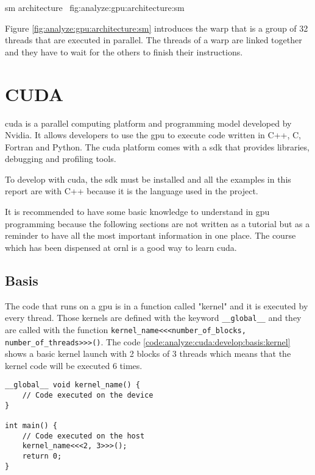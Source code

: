 {\acrshort{sm} architecture~\cite{nvidia-a100-architecture}}
{fig:analyze:gpu:architecture:sm}

Figure \ref{fig:analyze:gpu:architecture:sm} introduces the warp that is a
group of 32 threads that are executed in parallel.
The threads of a warp are linked together and they have to wait for the others
to finish their instructions.


\section{CUDA}
\label{ch:analyze:cuda}

\acrfull{cuda} is a parallel computing platform and programming model developed
by Nvidia.
It allows developers to use the \acrshort{gpu} to execute code written in C++, C, Fortran
and Python.
The \acrshort{cuda} platform comes with a \acrshort{sdk} that provides
libraries, debugging and profiling tools.

To develop with \acrshort{cuda}, the \acrshort{sdk} must be installed and all
the examples in this report are with C++ because it is the language used in the
project.

It is recommended to have some basic knowledge to understand in \acrshort{gpu}
programming because the following sections are not written as a tutorial but as
a reminder to have all the most important information in one place.
The course~\cite{cuda-training} which has been dispensed at \acrshort{ornl} is
a good way to learn \acrshort{cuda}.

\subsection{Basis}
\label{ch:analyze:cuda:basis}

The code that runs on a \acrshort{gpu} is in a function called "kernel" and it
is executed by every thread.
Those kernels are defined with the keyword \texttt{\_\_global\_\_} and they are called
with the function \texttt{kernel\_name<<<number\_of\_blocks, number\_of\_threads>>>()}.
The code \ref{code:analyze:cuda:develop:basis:kernel} shows a basic kernel
launch with 2 blocks of 3 threads which means that the kernel code will be
executed 6 times.

\begin{code}
    \label{code:analyze:cuda:basis:kernel}
    \begin{verbatim}
__global__ void kernel_name() {
    // Code executed on the device
}

int main() {
    // Code executed on the host
    kernel_name<<<2, 3>>>();
    return 0;
}
    \end{verbatim}
\end{code}

